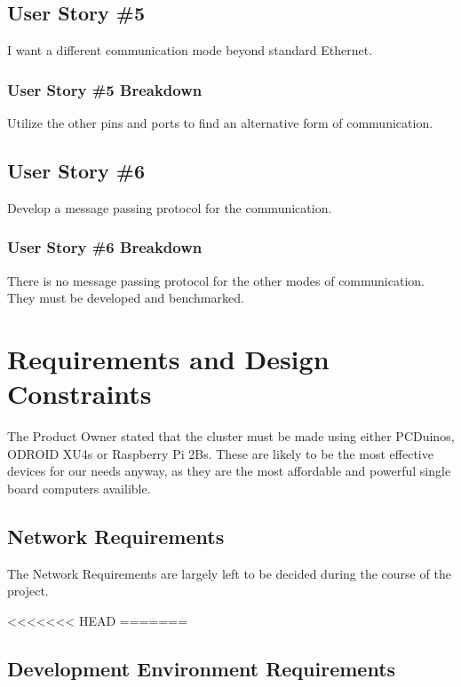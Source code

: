 \subsection{User Story \#5} 
I want a different communication mode beyond standard Ethernet.
\subsubsection{User Story \#5 Breakdown}
Utilize the other pins and ports to find an alternative form of communication.

\subsection{User Story \#6} 
Develop a message passing protocol for the communication.
\subsubsection{User Story \#6 Breakdown}
There is no message passing protocol for the other modes of communication. They must be developed and benchmarked.

\section{Requirements and Design Constraints}

The Product Owner stated that the cluster must be made using either PCDuinos, ODROID XU4s or Raspberry Pi 2Bs. These are likely to be  the most effective devices for our needs anyway, as they are the most affordable and powerful single board computers availible.


\subsection{Network Requirements}
The Network Requirements are largely left to be decided during the course of the project. 

<<<<<<< HEAD
=======

\subsection{Development Environment Requirements}


